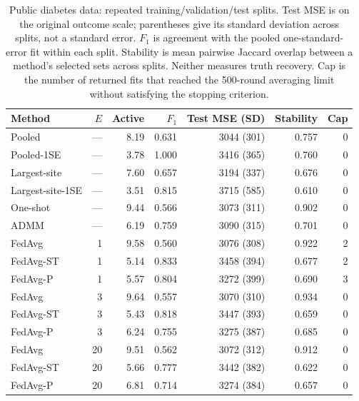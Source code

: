 \begin{table}[t]
\centering
\small
\caption{Public diabetes data: repeated training/validation/test splits. Test MSE is on the original outcome scale; parentheses give its standard deviation across splits, not a standard error. $F_1$ is agreement with the pooled one-standard-error fit within each split. Stability is mean pairwise Jaccard overlap between a method's selected sets across splits. Neither measures truth recovery. Cap is the number of returned fits that reached the 500-round averaging limit without satisfying the stopping criterion.}
\label{tab:diabetes}
\begin{tabular}{lrrrrrr}
\toprule
Method & $E$ & Active & $F_1$ & Test MSE (SD) & Stability & Cap \\
\midrule
Pooled & --- & 8.19 & 0.631 & 3044 (301) & 0.757 & 0 \\
Pooled-1SE & --- & 3.78 & 1.000 & 3416 (365) & 0.760 & 0 \\
Largest-site & --- & 7.60 & 0.657 & 3194 (337) & 0.676 & 0 \\
Largest-site-1SE & --- & 3.51 & 0.815 & 3715 (585) & 0.610 & 0 \\
One-shot & --- & 9.44 & 0.566 & 3073 (311) & 0.902 & 0 \\
ADMM & --- & 6.19 & 0.759 & 3090 (315) & 0.701 & 0 \\
FedAvg & 1 & 9.58 & 0.560 & 3076 (308) & 0.922 & 2 \\
FedAvg-ST & 1 & 5.14 & 0.833 & 3458 (394) & 0.677 & 2 \\
FedAvg-P & 1 & 5.57 & 0.804 & 3272 (399) & 0.690 & 3 \\
FedAvg & 3 & 9.64 & 0.557 & 3070 (310) & 0.934 & 0 \\
FedAvg-ST & 3 & 5.43 & 0.818 & 3447 (393) & 0.659 & 0 \\
FedAvg-P & 3 & 6.24 & 0.755 & 3275 (387) & 0.685 & 0 \\
FedAvg & 20 & 9.51 & 0.562 & 3072 (312) & 0.912 & 0 \\
FedAvg-ST & 20 & 5.66 & 0.777 & 3442 (382) & 0.622 & 0 \\
FedAvg-P & 20 & 6.81 & 0.714 & 3274 (384) & 0.657 & 0 \\
\bottomrule
\end{tabular}
\end{table}
